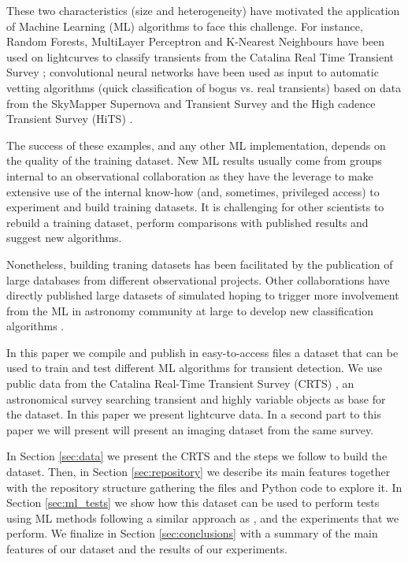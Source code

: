 \documentclass[usenatbib]{mnras}
\begin{document}
These two characteristics (size and heterogeneity) have
motivated the application of Machine Learning (ML) algorithms to face
this challenge.  
For instance, Random Forests, MultiLayer Perceptron and K-Nearest
Neighbours have been used on lightcurves to classify transients from
the Catalina Real Time Transient Survey \citep{1601.03931};  
convolutional neural networks have been used as 
input to automatic vetting algorithms (quick classification of bogus
vs. real transients) based on data from the SkyMapper Supernova and
Transient  Survey and the High cadence Transient Survey (HiTS)
\citep{1708.08947,1701.00458}.

The success of these examples, and any other ML implementation,
depends on the quality of the training dataset.
New ML results usually come from groups internal to an observational
collaboration as they have the leverage to make extensive use of the
internal know-how (and, sometimes, privileged access) to experiment
and build training datasets.
It is challenging for other scientists to rebuild a training
dataset, perform comparisons with published results and suggest new
algorithms. 

Nonetheless, building traning datasets has been facilitated by the
publication of large databases from different observational projects.
Other collaborations have directly published large datasets of simulated
hoping to trigger more involvement from the ML in astronomy
community at large to develop new classification algorithms \citep{2018arXiv181000001T}.

In this paper we compile and publish in easy-to-access files a dataset
that can be used to train and test different ML algorithms for
transient detection. 
We use public data from the Catalina Real-Time Transient Survey
(CRTS) \citep{1111.2566}, an astronomical survey searching transient
and highly variable objects as base for the dataset.
In this paper we present lightcurve data.
In a second part to this paper we will present will present an imaging
dataset from the same survey. 

\newpage
In Section \ref{sec:data} we present the CRTS and the steps we follow
to build the dataset.
Then, in Section \ref{sec:repository} we describe its main features together
with the repository structure gathering the files and Python code to explore it. 
In Section \ref{sec:ml_tests} we show how this dataset can be used to 
perform tests using ML methods following a similar approach as \cite{1601.03931},
and the experiments that we perform. 
We finalize in Section \ref{sec:conclusions} with a summary of the
main features of our dataset and the results of our experiments. 
\end{document}

